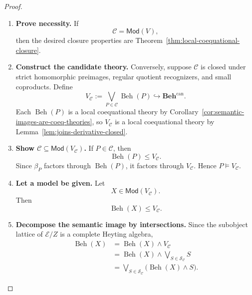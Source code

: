 \begin{proof}
    \leavevmode
    \begin{enumerate}
        \item \textbf{Prove necessity.}
        If
        \[
            \mathcal C=\mathsf{Mod}(V),
        \]
        then the desired closure properties are
        Theorem~\ref{thm:local-coequational-closure}.

        \item \textbf{Construct the candidate theory.}
        Conversely, suppose \(\mathcal C\) is closed under strict homomorphic
        preimages, regular quotient recognizers, and small coproducts. Define
        \[
            V_{\mathcal C}
            :=
            \bigvee_{P\in\mathcal C}\operatorname{Beh}(P)
            \hookrightarrow\mathbf{Beh}^{\mathrm{can}}.
        \]
        Each \(\operatorname{Beh}(P)\) is a local coequational theory by
        Corollary~\ref{cor:semantic-images-are-coeq-theories}, so
        \(V_{\mathcal C}\) is a local coequational theory by
        Lemma~\ref{lem:joins-derivative-closed}.

        \item \textbf{Show \(\mathcal C\subseteq\mathsf{Mod}(V_{\mathcal C})\).}
        If \(P\in\mathcal C\), then
        \[
            \operatorname{Beh}(P)\leq V_{\mathcal C}.
        \]
        Since \(\beta_P\) factors through \(\operatorname{Beh}(P)\), it factors
        through \(V_{\mathcal C}\). Hence \(P\models V_{\mathcal C}\).

        \item \textbf{Let a model be given.}
        Let
        \[
            X\in\mathsf{Mod}(V_{\mathcal C}).
        \]
        Then
        \[
            \operatorname{Beh}(X)\leq V_{\mathcal C}.
        \]

        \item \textbf{Decompose the semantic image by intersections.}
        Since the subobject lattice of \(\mathcal E/Z\) is a complete Heyting
        algebra,
        \[
        \begin{aligned}
            \operatorname{Beh}(X)
            &=
            \operatorname{Beh}(X)\wedge V_{\mathcal C} \\
            &=
            \operatorname{Beh}(X)\wedge
            \bigvee_{S\in\mathcal S_{\mathcal C}}S \\
            &=
            \bigvee_{S\in\mathcal S_{\mathcal C}}
            \bigl(\operatorname{Beh}(X)\wedge S\bigr).
        \end{aligned}
        \]


\end{enumerate}
\end{proof}
